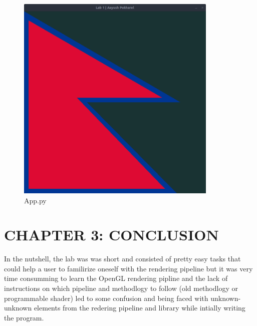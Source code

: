 \documentclass[12pt]{article}
\begin{document}
\begin{figure}[h]
    \centerline{\includegraphics[height=100mm]{flag.png}}
    \caption{App.py}
    \label{fig}
\end{figure}

\section{CHAPTER 3: CONCLUSION}
In the nutshell, the lab was was short and consisted of pretty easy tasks that could help a user to
familirize oneself with the rendering pipeline but it was very time consumming to learn the OpenGL rendering pipline
and the lack of instructions on which pipeline and methodlogy to follow (old methodlogy or programmable shader) led to some
confusion and being faced with unknown-unknown elements from the redering pipeline and library while intially writing the program.
\clearpage
\thispagestyle{empty}
\printbibliography
\end{document}
